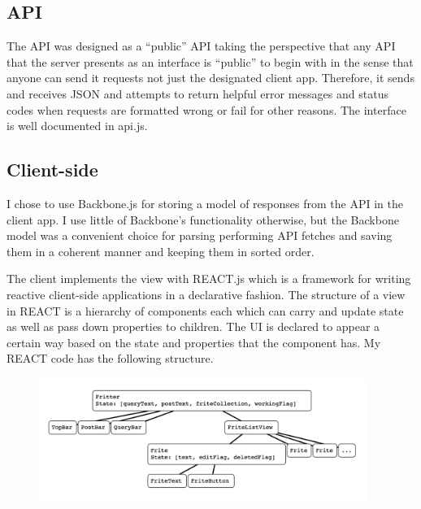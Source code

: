 \documentclass{amsart}
\begin{document}
\subsection{API}
The API was designed as a ``public'' API taking the perspective that any API that the
server presents as an interface is ``public'' to begin with in the sense that anyone
can send it requests not just the designated client app. Therefore, it sends and
receives JSON and attempts to return helpful error messages and status codes when
requests are formatted wrong or fail for other reasons. The interface is well documented
in api.js.


\subsection{Client-side}
I chose to use Backbone.js for storing a model of responses from the API in the client app. I use
little of Backbone's functionality otherwise, but the Backbone model was a convenient choice for
parsing performing API fetches and saving them in a coherent manner and keeping them in sorted order.

The client implements the view with REACT.js which is a framework for writing reactive client-side
applications in a declarative fashion. The structure of a view in REACT is a hierarchy of components
each which can carry and update state as well as pass down properties to children. The UI is declared
to appear a certain way based on the state and properties that the component has. My REACT code has
the following structure.
\begin{figure}[htbp]
    \centering
    \includegraphics[width=0.95\textwidth]{reacttree}
\end{figure}
\end{document}
